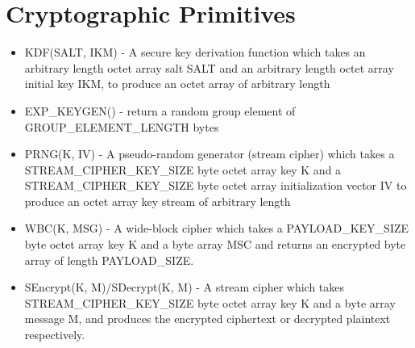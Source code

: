 \section{Cryptographic Primitives}\label{sec:cryptoprimitives}
\begin{itemize}
    \item KDF(SALT, IKM) - A secure key derivation function which takes an arbitrary length octet array salt SALT and an arbitrary length octet array initial key IKM, to produce an octet array of arbitrary length
    \item EXP\_KEYGEN() - return a random group element of GROUP\_ELEMENT\_LENGTH bytes
    \item PRNG(K, IV) - A pseudo-random generator (stream cipher) which takes a STREAM\_CIPHER\_KEY\_SIZE byte octet array key K and a STREAM\_CIPHER\_KEY\_SIZE byte octet array initialization vector IV to produce an octet array key stream of arbitrary length
    \item WBC(K, MSG) - A wide-block cipher which takes a PAYLOAD\_KEY\_SIZE byte octet array key K and a byte array MSC and returns an encrypted byte array of length PAYLOAD\_SIZE.  
    \item SEncrypt(K, M)/SDecrypt(K, M) - A stream cipher which takes STREAM\_CIPHER\_KEY\_SIZE byte octet array key K and a byte array message M, and produces the encrypted ciphertext or decrypted plaintext respectively.
\end{itemize}